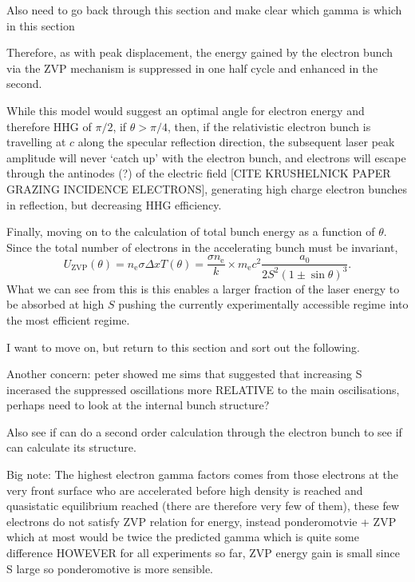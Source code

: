 Also need to go back through this section and make clear which gamma is which in this section

Therefore, as with peak displacement, the energy gained by the electron bunch via the ZVP mechanism is suppressed in one half cycle and enhanced in the second.

While this model would suggest an optimal angle for electron energy and therefore \ac{HHG} of $\pi/2$, if $\theta > \pi/4$, then, if the relativistic electron bunch is travelling at $c$ along the specular reflection direction, the subsequent laser peak amplitude will never `catch up' with the electron bunch, and electrons will escape through the antinodes (?) of the electric field [CITE KRUSHELNICK PAPER GRAZING INCIDENCE ELECTRONS], generating high charge electron bunches in reflection, but decreasing \ac{HHG efficiency}.

Finally, moving on to the calculation of total bunch energy as a function of $\theta$. Since the total number of electrons in the accelerating bunch must be invariant,
\begin{equation}\label{eq:zvp_Uzvp_theta}
	U_\mathrm{ZVP}(\theta) = n_\mathrm{e}\sigma\Delta x T(\theta) =  \frac{\sigma n_\mathrm{e}}{k}\times m_\mathrm{e}c^2\frac{a_0}{2S^2(1\pm \sin\theta)^3}.
\end{equation}
What we can see from this is this enables a larger fraction of the laser energy to be absorbed at high $S$ pushing the currently experimentally accessible regime into the most efficient regime.

I want to move on, but return to this section and sort out the following. 


Another concern: peter showed me sims that suggested that increasing S incerased the suppressed oscillations more RELATIVE to the main oscilisations, perhaps need to look at the internal bunch structure?

Also see if can do a second order calculation through the electron bunch to see if can calculate its structure.



Big note:
The highest electron gamma factors comes from those electrons at the very front surface who are accelerated before high density is reached and quasistatic equilibrium reached (there are therefore very few of them), these few electrons do not satisfy ZVP relation for energy, instead 
ponderomotvie + ZVP which at most would be twice the predicted gamma which is quite some difference HOWEVER for all experiments so far, ZVP energy gain is small since S large so ponderomotive is more sensible.



